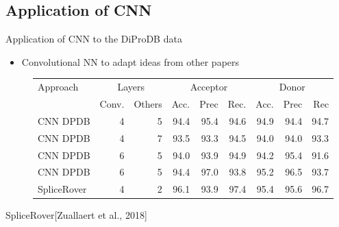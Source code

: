 \documentclass[10pt]{beamer}
\begin{document}
\subsection{Application of CNN}
\begin{frame}{Application of CNN to the DiProDB data}
	\begin{itemize}
		\item Convolutional NN to adapt ideas from other papers
	\end{itemize}
	\pause
	\begin{figure}
		\small
		\centering
		\begingroup
		\def\arraystretch{1.2}
		\begin{tabular}{|l|r|r|r|r|r|r|r|r|}
			\hline
			Approach  & \multicolumn{2}{c}{Layers} & \multicolumn{3}{|c|}{Acceptor} & \multicolumn{3}{c|}{Donor} \\
			\cline{2-9}
			&Conv. & Others & Acc. & Prec & Rec. & Acc. & Prec & Rec \\
			\hline
			CNN DPDB & 4 & 5 & 94.4 & 95.4 & 94.6 & 94.9 & 94.4 & 94.7 \\
			CNN DPDB & 4 & 7 & 93.5 & 93.3 & 94.5 & 94.0 & 94.0 & 93.3 \\
			CNN DPDB & 6 & 5 & 94.0 & 93.9 & 94.9 & 94.2 & 95.4 & 91.6 \\
			CNN DPDB & 6 & 5 & 94.4 & 97.0 & 93.8 & 95.2 & 96.5 & 93.7 \\
			SpliceRover & 4 & 2 & 96.1 & 93.9 & 97.4 & 95.4 & 95.6 & 96.7 \\
			
			\hline  
		\end{tabular}
		\endgroup
	\end{figure}
	SpliceRover[Zuallaert et al., 2018]

\end{frame}
\end{document}
